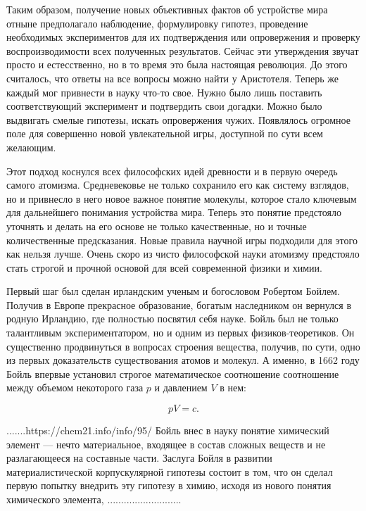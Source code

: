 Таким образом, получение новых объективных фактов об устройстве мира отныне предполагало наблюдение, формулировку гипотез, проведение необходимых экспериментов для их подтверждения или опровержения и проверку воспроизводимости всех полученных результатов.
Сейчас эти утверждения звучат просто и естесственно, но в то время это была настоящая революция.
До этого считалось, что ответы на все вопросы можно найти у Аристотеля.
Теперь же каждый мог привнести в науку что-то свое.
Нужно было лишь поставить соответствующий эксперимент и подтвердить свои догадки.
Можно было выдвигать смелые гипотезы, искать опровержения чужих.
Появлялось огромное поле для совершенно новой увлекательной игры, доступной по сути всем желающим.

Этот подход коснулся всех философских идей древности и в первую очередь самого атомизма.
Средневековье не только сохранило его как систему взглядов, но и привнесло в него новое важное понятие молекулы, которое стало ключевым для дальнейшего понимания устройства мира. 
Теперь это понятие предстояло уточнять и делать на его основе не только качественные, но и точные количественные предсказания.
Новые правила научной игры подходили для этого как нельзя лучше.
Очень скоро из чисто философской науки атомизму предстояло стать строгой и прочной основой для всей современной физики и химии.

Первый шаг был сделан ирландским ученым и богословом Робертом Бойлем.
Получив в Европе прекрасное образование, богатым наследником он вернулся в родную Ирландию, где полностью посвятил себя науке.
Бойль был не только талантливым экспериментатором, но и одним из первых физиков-теоретиков.
Он существенно продвинуться в вопросах строения вещества, получив, по сути, одно из первых доказательств существования атомов и молекул.
А именно, в 1662 году Бойль впервые установил строгое математическое соотношение соотношение между объемом некоторого газа $p$ и давлением $V$ в нем:

\begin{equation}\label{eq:boil}
pV = c.
\end{equation}


.......https://chem21.info/info/95/
Бойль внес в науку понятие химический элемент — нечто материальное, входящее в состав сложных веществ и не разлагающееся на составные части. Заслуга Бойля в развитии материалистической корпускулярной гипотезы состоит в том, что он сделал первую попытку внедрить эту гипотезу в химию, исходя из нового понятия химического элемента,
...........................

